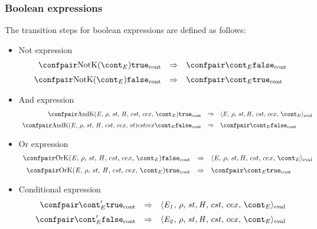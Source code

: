 \documentclass{article}
\begin{document}
\subsubsection{Boolean expressions}
\label{subsubsec:bool-expressions}
\newcommand{\true}{\tt{true}}
\newcommand{\false}{\tt{false}}


The transition steps for boolean expressions are defined as follows:
\begin{itemize}
\item Not expression\\
\[
  \begin{array}{rll}
	\cesktrans{
		\contconf{\NotK{\econt}}{\true}}{
		\contconf{\econt}{\false}}
		\\[2mm]

	\cesktrans{
		\contconf{\NotK{\econt}}{\false}}{
		\contconf{\econt}{\true}}
  \end{array}
\]
\item And expression\\
\[
  \begin{array}{rcl}
	\cesktrans{
		\contconf{\AndK{\expressionmeta}{\env}{\econt}}{\true}}{
		\evalconf{\expressionmeta}{\env}{\strace}{\cstrace}{\cex}{\econt}}
		\\[2mm]

	\cesktrans{
		\contconf{\AndK{\expressionmeta}{\env}{\strace}{\cstrace}{\cex}{\econt}}{\false}}{
		\contconf{\econt}{\false}}
  \end{array}
\]
\item Or expression\\
\[
  \begin{array}{rcl}
	\cesktrans{
		\contconf{\OrK{\expressionmeta}{\env}{\econt}}{\false}}{
		\evalconf{\expressionmeta}{\env}{\strace}{\cstrace}{\cex}{\econt}}
		\\[2mm]

	\cesktrans{
		\contconf{\OrK{\expressionmeta}{\env}{\econt}}{\true}}{
		\contconf{\econt}{\true}}
  \end{array}
\]
\item Conditional expression\\
\[
  \begin{array}{rcl}
	\cesktrans{
		\contconf{\econt'}{\true}}{
		\evalconf{\expri{1}}{\env}{\strace}{\cstrace}{\cex}{\econt}}
		\\[2mm]

	\cesktrans{
		\contconf{\econt'}{\false}}{
		\evalconf{\expri{2}}{\env}{\strace}{\cstrace}{\cex}{\econt}}
		\\[2mm]
  \end{array}
\]

\end{itemize}
\end{document}
